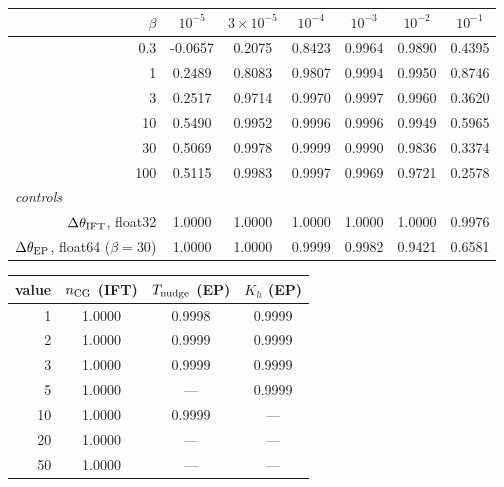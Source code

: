 \begin{tabular}{r cccccc}
\toprule
$\beta$ & $10^{-5}$ & $3\times10^{-5}$ & $10^{-4}$ & $10^{-3}$ & $10^{-2}$ & $10^{-1}$ \\ \midrule
0.3 & \cellcolor{gray!15}-0.0657 & \cellcolor{gray!15}0.2075 & \cellcolor{gray!15}0.8423 & 0.9964 & \cellcolor{gray!15}0.9890 & \cellcolor{gray!15}0.4395 \\
1 & \cellcolor{gray!15}0.2489 & \cellcolor{gray!15}0.8083 & \cellcolor{gray!15}0.9807 & 0.9994 & 0.9950 & \cellcolor{gray!15}0.8746 \\
3 & \cellcolor{gray!15}0.2517 & \cellcolor{gray!15}0.9714 & 0.9970 & 0.9997 & 0.9960 & \cellcolor{gray!15}0.3620 \\
10 & \cellcolor{gray!15}0.5490 & 0.9952 & 0.9996 & 0.9996 & 0.9949 & \cellcolor{gray!15}0.5965 \\
30 & \cellcolor{gray!15}0.5069 & 0.9978 & 0.9999 & 0.9990 & \cellcolor{gray!15}0.9836 & \cellcolor{gray!15}0.3374 \\
100 & \cellcolor{gray!15}0.5115 & 0.9983 & 0.9997 & 0.9969 & \cellcolor{gray!15}0.9721 & \cellcolor{gray!15}0.2578 \\
\midrule
\multicolumn{7}{l}{\itshape controls} \\
$\Delta\theta_{\rm IFT}$, float32 & 1.0000 & 1.0000 & 1.0000 & 1.0000 & 1.0000 & 0.9976 \\
$\Delta\theta_{\rm EP}$, float64 ($\beta{=}30$) & 1.0000 & 1.0000 & 0.9999 & 0.9982 & \cellcolor{gray!15}0.9421 & \cellcolor{gray!15}0.6581 \\
\bottomrule
\end{tabular}

\begin{tabular}{r ccc}
\toprule
value & $n_{\rm CG}$ (IFT) & $T_{\rm nudge}$ (EP) & $K_h$ (EP) \\ \midrule
1 & 1.0000 & 0.9998 & 0.9999 \\
2 & 1.0000 & 0.9999 & 0.9999 \\
3 & 1.0000 & 0.9999 & 0.9999 \\
5 & 1.0000 & --- & 0.9999 \\
10 & 1.0000 & 0.9999 & --- \\
20 & 1.0000 & --- & --- \\
50 & 1.0000 & --- & --- \\
\bottomrule
\end{tabular}
